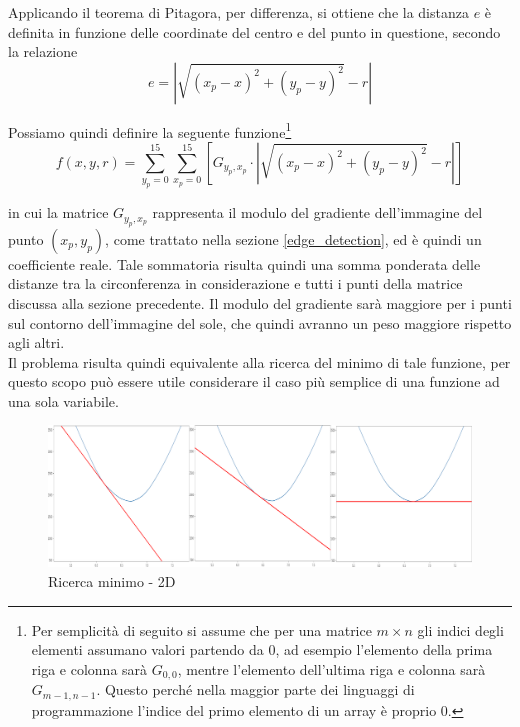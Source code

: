 \documentclass[12pt]{article}
\begin{document}
        
        Applicando il teorema di Pitagora, per differenza, si ottiene che la distanza $ e $ è definita in funzione delle coordinate del centro e del punto in questione, secondo la relazione
        \begin{equation}
             e = \left| \sqrt{(x_p-x)^2 + (y_p-y)^2} -r \right|
        \end{equation}
        
        
        Possiamo quindi definire la seguente funzione\footnote{Per semplicità di seguito si assume che per una matrice $m \times n$ gli indici degli elementi assumano valori partendo da 0, ad esempio l'elemento della prima riga e colonna sarà $G_{0,0}$, mentre l'elemento dell'ultima riga e colonna sarà $G_{m-1, n-1}$. Questo perché nella maggior parte dei linguaggi di programmazione l'indice del primo elemento di un array è proprio 0.}
        \begin{equation}
            f(x, y, r) = \sum_{y_p = 0}^{15} \sum_{x_p = 0}^{15} \left[ G_{y_p, x_p} \cdot \left| \sqrt{(x_p-x)^2 + (y_p-y)^2} -r \right| \right] 
        \end{equation}
        
        
        in cui la matrice $ G_{y_p, x_p} $ rappresenta il modulo del gradiente dell'immagine del punto $ (x_p, y_p) $, come trattato nella sezione \ref{edge_detection}, ed è quindi un coefficiente reale. Tale sommatoria risulta quindi una somma ponderata delle distanze tra la circonferenza in considerazione e tutti i punti della matrice discussa alla sezione precedente. Il modulo del gradiente sarà maggiore per i punti sul contorno dell'immagine del sole, che quindi avranno un peso maggiore rispetto agli altri.\\
        
        Il problema risulta quindi equivalente alla ricerca del minimo di tale funzione, per questo scopo può essere utile considerare il caso più semplice di una funzione ad una sola variabile.
        
        \begin{figure}[h]
        \centering
            \includegraphics[width=\textwidth]{Draws/matplotlib_draws/2d_descent_block.png}
            \caption{Ricerca minimo - 2D}
            \label{2d_min_search}
        \end{figure}
        
\end{document}
